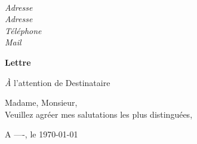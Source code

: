 % 
% 






\sffamily
\hfill
\begin{flushleft}
  \\[.35ex]
  \small\itshape
  Adresse\\
  Adresse\\[.35ex]
  Téléphone\\
  Mail
\end{flushleft}

\begin{center}
\Large \bfseries Lettre
\end{center}

\begin{flushright}
  {\textit À l'attention de Destinataire}\\[.35ex]
  \small\itshape
\end{flushright}
\hfill

Madame, Monsieur,\\

Veuillez agréer mes salutations les plus distinguées,\\

\hfill
\begin{flushright}
A ----, le \today \\
\end{flushright}


\vfill

